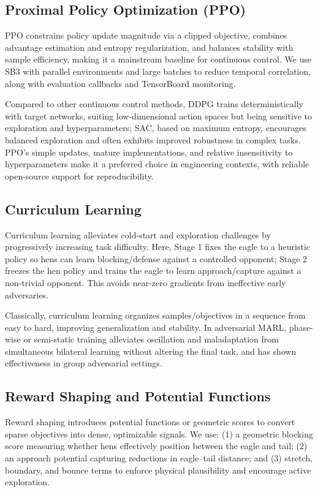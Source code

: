\documentclass[12pt]{article}
\begin{document}
\subsection{Proximal Policy Optimization (PPO)}
PPO constrains policy update magnitude via a clipped objective, combines advantage estimation and entropy regularization, and balances stability with sample efficiency, making it a mainstream baseline for continuous control. We use SB3 with parallel environments and large batches to reduce temporal correlation, along with evaluation callbacks and TensorBoard monitoring.

Compared to other continuous control methods, DDPG trains deterministically with target networks, suiting low-dimensional action spaces but being sensitive to exploration and hyperparameters\cite{lillicrap2016ddpg}; SAC, based on maximum entropy, encourages balanced exploration and often exhibits improved robustness in complex tasks\cite{haarnoja2018sac}. PPO’s simple updates, mature implementations, and relative insensitivity to hyperparameters make it a preferred choice in engineering contexts, with reliable open-source support for reproducibility\cite{raffin2022stable}.

\subsection{Curriculum Learning}
Curriculum learning alleviates cold-start and exploration challenges by progressively increasing task difficulty. Here, Stage 1 fixes the eagle to a heuristic policy so hens can learn blocking/defense against a controlled opponent; Stage 2 freezes the hen policy and trains the eagle to learn approach/capture against a non-trivial opponent. This avoids near-zero gradients from ineffective early adversaries.

Classically, curriculum learning organizes samples/objectives in a sequence from easy to hard, improving generalization and stability\cite{bengio2009curriculum}. In adversarial MARL, phase-wise or semi-static training alleviates oscillation and maladaptation from simultaneous bilateral learning without altering the final task, and has shown effectiveness in group adversarial settings\cite{cai2023multiphase}.

\subsection{Reward Shaping and Potential Functions}
Reward shaping introduces potential functions or geometric scores to convert sparse objectives into dense, optimizable signals. We use: (1) a geometric blocking score measuring whether hens effectively position between the eagle and tail; (2) an approach potential capturing reductions in eagle–tail distance; and (3) stretch, boundary, and bounce terms to enforce physical plausibility and encourage active exploration.
\end{document}
